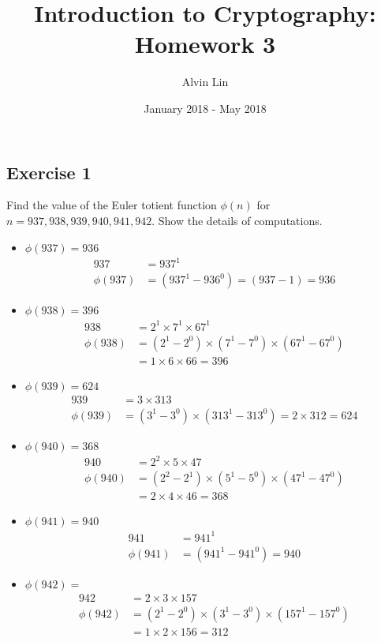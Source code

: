 \documentclass{math}
\title{Introduction to Cryptography: Homework 3}
\author{Alvin Lin}
\date{January 2018 - May 2018}
\begin{document}
\maketitle

\subsection*{Exercise 1}
Find the value of the Euler totient function \( \phi(n) \) for \( n = 937, 938,
939, 940, 941, 942 \). Show the details of computations.
\begin{itemize}
  \item \( \phi(937) = 936 \)
  \begin{align*}
    937 &= 937^1 \\
    \phi(937) &= (937^1-936^0) = (937-1) = 936
  \end{align*}
  \item \( \phi(938) = 396 \)
  \begin{align*}
    938 &= 2^1\times7^1\times67^1 \\
    \phi(938) &= (2^1-2^0)\times(7^1-7^0)\times(67^1-67^0) \\
    &= 1\times6\times66 = 396
  \end{align*}
  \item \( \phi(939) = 624 \)
  \begin{align*}
    939 &= 3\times313 \\
    \phi(939) &= (3^1-3^0)\times(313^1-313^0) = 2\times312 = 624
  \end{align*}
  \item \( \phi(940) = 368 \)
  \begin{align*}
    940 &= 2^2\times5\times47 \\
    \phi(940) &= (2^2-2^1)\times(5^1-5^0)\times(47^1-47^0) \\
    &= 2\times4\times46 = 368
  \end{align*}
  \item \( \phi(941) = 940 \)
  \begin{align*}
    941 &= 941^1 \\
    \phi(941) &= (941^1-941^0) = 940
  \end{align*}
  \item \( \phi(942) = \)
  \begin{align*}
    942 &= 2\times3\times157 \\
    \phi(942) &= (2^1-2^0)\times(3^1-3^0)\times(157^1-157^0) \\
    &= 1\times2\times156 = 312
  \end{align*}
\end{itemize}
\end{document}
